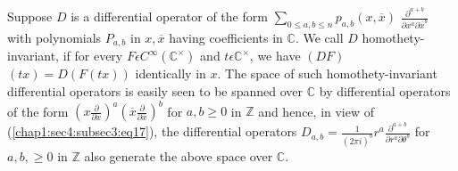 Suppose $D$ is a differential operator of the form $\sum\limits_{0\le
  a,b\le n}p_{a,b}(x,\overline{x})$ $\frac{\partial^{a+b}}{\partial x^a\partial
  \overline{x}^b}$ with polynomials $P_{a,b}$ in $x,\overline{x}$ having
coefficients in $\mathbb{C}$. We call $D$ homothety-invariant, if for
every $F\epsilon C^\infty(\mathbb{C}^\times)$ and $t\epsilon \mathbb{C}^\times$,
we have $(DF)$ $(tx)=D(F(tx))$ identically in $x$. The space of such
homothety-invariant differential operators is easily seen to be
spanned over $\mathbb{C}$ by differential operators of the form
$(x\frac{\partial}{\partial x})^a(\overline{x}\frac{\partial}{\partial
  \overline{x}})^b$ for $a,b\ge 0$ in $\mathbb{Z}$ and hence, in view
of (\ref{chap1:sec4:subsec3:eq17}), the differential operators
$D_{a,b}=\frac{1}{(2\pi 
  i)^b}r^a\frac{\partial^{a+b}}{\partial r^{a}\partial\theta^{b}}$ for
$a,b,\ge 0$ in $\mathbb{Z}$ also generate the above space over
$\mathbb{C}$.

